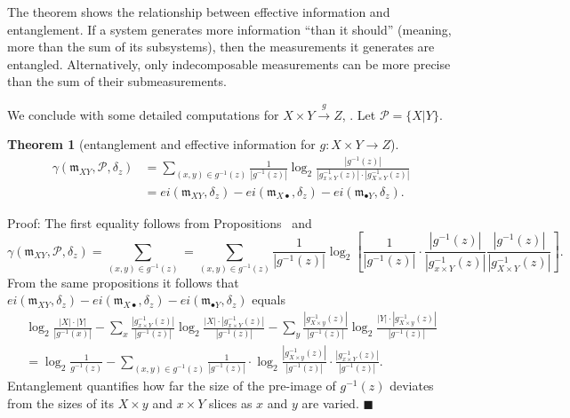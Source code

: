 \documentclass[12pt]{article}
\newcommand{\eop}{{$\blacksquare$}}
\newcommand{\fm}{{\mathfrak m}}
\newcommand{\cP}{{\mathcal P}}
\newtheorem{thm}{Theorem}
\theoremstyle{remark}
\begin{document}
The theorem shows the relationship between effective information
and entanglement. If a system generates more information ``than 
it should'' (meaning, more than the sum of its subsystems), then
the measurements it generates are entangled. Alternatively, only
indecomposable measurements can be more precise than the sum of 
their submeasurements.

We conclude with some detailed computations for 
$X\times Y\xrightarrow{g}Z$, %
. 
Let $\cP=\{X|Y\}$.

\begin{thm}[entanglement and effective information for 
$g:X\times Y\rightarrow Z$]
	\label{t:g_ei}
	\begin{align*}
		\gamma(\fm_{XY},\cP,\delta_z) & = 
        \sum_{(x,y)\in g^{-1}(z)}
		\frac{1}{|g^{-1}(z)|}\log_2\frac{|g^{-1}(z)|}
        {|g^{-1}_{x\times Y}(z)|\cdot |g^{-1}_{X\times Y}(z)|} \\
		& = ei(\fm_{XY},\delta_z) - ei(\fm_{X\bullet},\delta_z) 
        - ei(\fm_{\bullet Y},\delta_z).
	\end{align*}
\end{thm}

\noindent
Proof:
The first equality follows from Propositions~%
and %
\begin{equation*}
    \gamma(\fm_{XY},\cP,\delta_z)=\sum_{(x,y)\in g^{-1}(z)}
	= \sum_{(x,y)\in g^{-1}(z)}\frac{1}{|g^{-1}(z)|}\log_2
    \left[
	\frac{1}{|g^{-1}(z)|}\cdot \frac{|g^{-1}(z)|}
    {|g^{-1}_{x\times Y}(z)|}
	\frac{|g^{-1}(z)|}{|g^{-1}_{X\times Y}(z)|}\right].
\end{equation*}
From the same propositions it follows that 
$ei(\fm_{XY},\delta_z) - ei(\fm_{X\bullet},\delta_z) - 
ei(\fm_{\bullet Y},\delta_z)$ equals
\begin{gather*}
	 \log_2\frac{|X|\cdot|Y|}{|g^{-1}(x)|}-\sum_{x}
     \frac{|g^{-1}_{x\times Y}(z)|}{|g^{-1}(z)|}\log_2
	\frac{|X|\cdot|g^{-1}_{x\times Y}(z)|}{|g^{-1}(z)|}
	-\sum_y \frac{|g^{-1}_{X\times y}(z)|}{|g^{-1}(z)|}
    \log_2\frac{|Y|\cdot|g^{-1}_{X\times y}(z)|}{|g^{-1}(z)|}\\
	= \log_2 \frac{1}{g^{-1}(z)} - \sum_{(x,y)\in g^{-1}(z)}
    \frac{1}{|g^{-1}(z)|}\cdot
	\log_2\frac{|g^{-1}_{X\times y}(z)|}{|g^{-1}(z)|}\cdot
    \frac{|g^{-1}_{x\times Y}(z)|}{|g^{-1}(z)|}.
\end{gather*}
Entanglement quantifies how far the size of the pre-image of 
$g^{-1}(z)$ deviates from the sizes of its $X\times y$ and 
$x\times Y$ slices as $x$ and $y$ are varied. 
\eop
\end{document}
